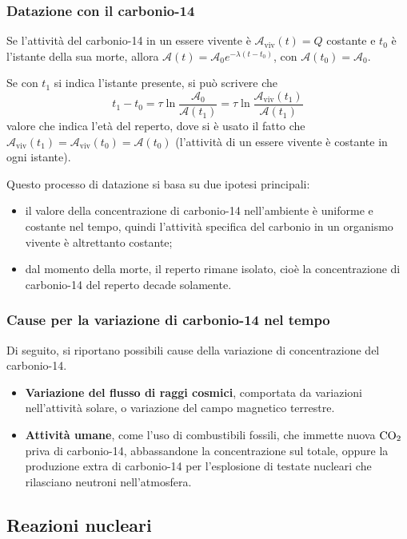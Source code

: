 \documentclass[11pt, a4paper]{scrartcl}
\theoremstyle{style}
\numberwithin{equation}{subsection}
\begin{document}
\subsubsection{Datazione con il carbonio-14}

Se l'attivit\`a del carbonio-14 in un essere vivente \`e $\mathcal{A}_\text{viv} (t) = Q$ costante e $t_0$ \`e l'istante della sua morte, allora $\mathcal{A} (t) = \mathcal{A} _0 e^{-\lambda (t-t_0)}$, con $\mathcal{A} (t_0) = \mathcal{A} _0$.

Se con $t_1$ si indica l'istante presente, si pu\`o scrivere che 
\[
t_1-t_0 = \tau  \ln \frac{\mathcal{A} _0}{\mathcal{A} (t_1)} = \tau  \ln \frac{\mathcal{A} _\text{viv}(t_1)}{\mathcal{A} (t_1)}
\] 
valore che indica l'et\`a del reperto, dove si \`e usato il fatto che $\mathcal{A}_\text{viv}(t_1) = \mathcal{A} _\text{viv}(t_0) = \mathcal{A} (t_0) $ (l'attivit\`a di un essere vivente \`e costante in ogni istante).

Questo processo di datazione si basa su due ipotesi principali:
\begin{itemize}
	\item il valore della concentrazione di carbonio-14 nell'ambiente \`e uniforme e costante nel tempo, quindi l'attivit\`a specifica del carbonio in un organismo vivente \`e altrettanto costante;
	\item dal momento della morte, il reperto rimane isolato, cio\`e la concentrazione di carbonio-14 del reperto decade solamente.
\end{itemize}
\subsubsection{Cause per la variazione di carbonio-14 nel tempo}

Di seguito, si riportano possibili cause della variazione di concentrazione del carbonio-14.
\begin{itemize}
	\item \textbf{Variazione del flusso di raggi cosmici}, comportata da variazioni nell'attivit\`a solare, o variazione del campo magnetico terrestre.
	\item \textbf{Attivit\`a umane}, come l'uso di combustibili fossili, che immette nuova $\ce{CO_2}$ priva di carbonio-14, abbassandone la concentrazione sul totale, oppure la produzione extra di carbonio-14 per l'esplosione di testate nucleari che rilasciano neutroni nell'atmosfera.
\end{itemize}
\subsection{Reazioni nucleari}
\end{document}
